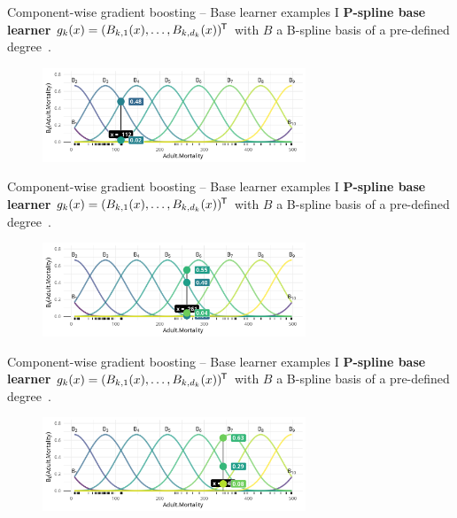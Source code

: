 \begin{frame}{Component-wise gradient boosting -- Base learner examples I}
  \textbf{P-spline base learner} $g_k(x) = (B_{k,1}(x), \dots, B_{k,d_k}(x))^{\mkern-1.5mu\mathsf{T}}$ with $B$ a B-spline basis of a pre-defined degree~\citep{eilers1996flexible}.
  \begin{center}
    \begin{figure}
      \includegraphics[width=0.7\textwidth]{figures/bs-base/fig-bs70.png}
    \end{figure}
  \end{center}
  
  \addtocounter{framenumber}{-1}
\end{frame}


\begin{frame}{Component-wise gradient boosting -- Base learner examples I}
  \textbf{P-spline base learner} $g_k(x) = (B_{k,1}(x), \dots, B_{k,d_k}(x))^{\mkern-1.5mu\mathsf{T}}$ with $B$ a B-spline basis of a pre-defined degree~\citep{eilers1996flexible}.
  \begin{center}
    \begin{figure}
      \includegraphics[width=0.7\textwidth]{figures/bs-base/fig-bs5.png}
    \end{figure}
  \end{center}
  
  \addtocounter{framenumber}{-1}
\end{frame}


\begin{frame}{Component-wise gradient boosting -- Base learner examples I}
  \textbf{P-spline base learner} $g_k(x) = (B_{k,1}(x), \dots, B_{k,d_k}(x))^{\mkern-1.5mu\mathsf{T}}$ with $B$ a B-spline basis of a pre-defined degree~\citep{eilers1996flexible}.
  \begin{center}
    \begin{figure}
      \includegraphics[width=0.7\textwidth]{figures/bs-base/fig-bs10.png}
    \end{figure}
  \end{center}
  
  \addtocounter{framenumber}{-1}
\end{frame}

